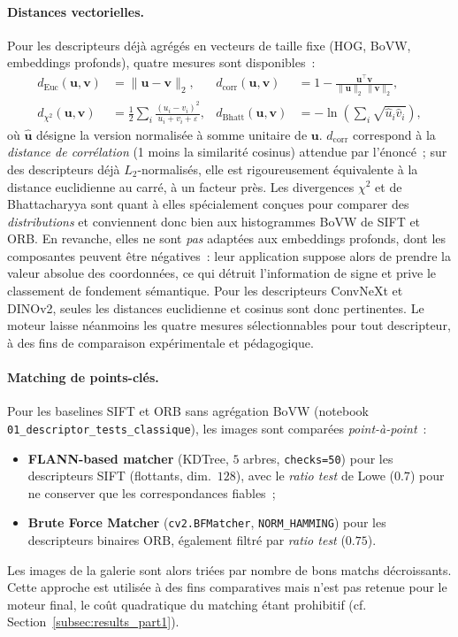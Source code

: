 \documentclass[a4paper,11pt]{article}
\begin{document}
\paragraph{Distances vectorielles.}
Pour les descripteurs déjà agrégés en vecteurs de taille fixe (HOG,
BoVW, embeddings profonds), quatre mesures sont disponibles~:
\begin{align*}
d_{\text{Euc}}(\mathbf{u},\mathbf{v}) &= \lVert \mathbf{u}-\mathbf{v}\rVert_2,
&
d_{\text{corr}}(\mathbf{u},\mathbf{v}) &= 1 - \frac{\mathbf{u}^{\top}\mathbf{v}}{\lVert\mathbf{u}\rVert_2\,\lVert\mathbf{v}\rVert_2}, \\[2pt]
d_{\chi^2}(\mathbf{u},\mathbf{v}) &= \tfrac{1}{2}\sum_i \frac{(u_i-v_i)^2}{u_i+v_i+\varepsilon},
&
d_{\text{Bhatt}}(\mathbf{u},\mathbf{v}) &= -\ln\!\left(\sum_i \sqrt{\hat u_i \hat v_i}\right),
\end{align*}
où $\hat{\mathbf u}$ désigne la version normalisée à somme unitaire de
$\mathbf u$. $d_{\text{corr}}$ correspond à la \emph{distance de
corrélation} (1 moins la similarité cosinus) attendue par l'énoncé~; sur
des descripteurs déjà $L_2$-normalisés, elle est rigoureusement
équivalente à la distance euclidienne au carré, à un facteur près. Les
divergences $\chi^2$ et de Bhattacharyya sont quant à elles spécialement
conçues pour comparer des \emph{distributions} et conviennent donc bien
aux histogrammes BoVW de SIFT et ORB. En revanche, elles ne sont
\emph{pas} adaptées aux embeddings profonds, dont les composantes
peuvent être négatives~: leur application suppose alors de prendre la
valeur absolue des coordonnées, ce qui détruit l'information de signe et
prive le classement de fondement sémantique. Pour les descripteurs
ConvNeXt et DINOv2, seules les distances euclidienne et cosinus sont
donc pertinentes. Le moteur laisse néanmoins les quatre mesures
sélectionnables pour tout descripteur, à des fins de comparaison
expérimentale et pédagogique.

\paragraph{Matching de points-clés.}
Pour les baselines SIFT et ORB sans agrégation BoVW (notebook
\texttt{01\_descriptor\_tests\_classique}), les images sont comparées
\emph{point-à-point}~:
\begin{itemize}
    \item \textbf{FLANN-based matcher} (KDTree, $5$ arbres,
    \texttt{checks=50}) pour les descripteurs SIFT (flottants,
    dim.~$128$), avec le \textit{ratio test} de Lowe ($0.7$) pour ne
    conserver que les correspondances fiables~;
    \item \textbf{Brute Force Matcher} (\texttt{cv2.BFMatcher},
    \texttt{NORM\_HAMMING}) pour les descripteurs binaires ORB,
    également filtré par \textit{ratio test} ($0.75$).
\end{itemize}
Les images de la galerie sont alors triées par nombre de bons matchs
décroissants. Cette approche est utilisée à des fins comparatives mais
n'est pas retenue pour le moteur final, le coût quadratique du matching
étant prohibitif (cf. Section~\ref{subsec:results_part1}).
\end{document}

